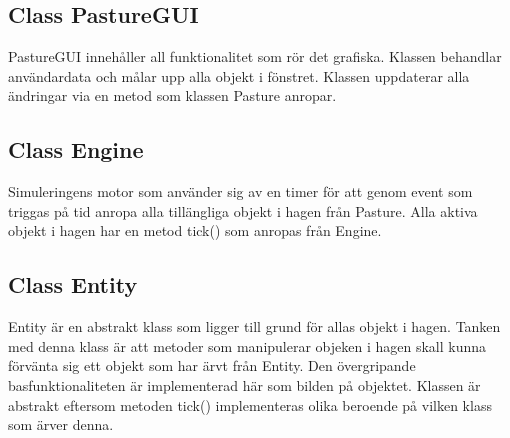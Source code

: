 \documentclass{article}
\begin{document}
\subsection{Class PastureGUI}
PastureGUI innehåller all funktionalitet som rör det grafiska. Klassen behandlar användardata och målar upp alla objekt i fönstret.
Klassen uppdaterar alla ändringar via en metod som klassen Pasture anropar.

\subsection{Class Engine}
Simuleringens motor som använder sig av en timer för att genom event som triggas på tid anropa alla tillängliga objekt i hagen från Pasture.
Alla aktiva objekt i hagen har en metod tick() som anropas från Engine.

\subsection{Class Entity}
Entity är en abstrakt klass som ligger till grund för allas objekt i hagen.
Tanken med denna klass är att metoder som manipulerar objeken i hagen skall kunna förvänta sig ett objekt som har ärvt från Entity.
Den övergripande basfunktionaliteten är implementerad här som bilden på objektet. Klassen är abstrakt eftersom metoden tick() implementeras olika beroende på vilken klass som ärver denna. 
\end{document}

